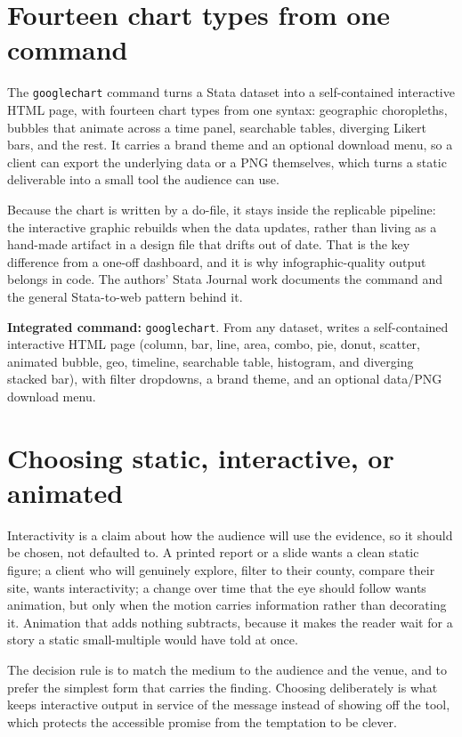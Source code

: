 \documentclass[
    a4paper,
    fontsize=10pt,
    twoside=true,
    numbers=noenddot,
]{kaobook}
\begin{document}
\section{Fourteen chart types from one command}
The \texttt{googlechart} command turns a Stata dataset into a self-contained interactive HTML page, with fourteen chart types from one syntax: geographic choropleths, bubbles that animate across a time panel, searchable tables, diverging Likert bars, and the rest. It carries a brand theme and an optional download menu, so a client can export the underlying data or a PNG themselves, which turns a static deliverable into a small tool the audience can use.

Because the chart is written by a do-file, it stays inside the replicable pipeline: the interactive graphic rebuilds when the data updates, rather than living as a hand-made artifact in a design file that drifts out of date. That is the key difference from a one-off dashboard, and it is why infographic-quality output belongs in code. The authors' Stata Journal work documents the command and the general Stata-to-web pattern behind it.

\begin{kaobox}[frametitle=Package Integration: \texttt{googlechart}]
\textbf{Integrated command:} \texttt{googlechart}. From any dataset, writes a self-contained interactive HTML page (column, bar, line, area, combo, pie, donut, scatter, animated bubble, geo, timeline, searchable table, histogram, and diverging stacked bar), with filter dropdowns, a brand theme, and an optional data/PNG download menu.
\end{kaobox}

\section{Choosing static, interactive, or animated}
Interactivity is a claim about how the audience will use the evidence, so it should be chosen, not defaulted to. A printed report or a slide wants a clean static figure; a client who will genuinely explore, filter to their county, compare their site, wants interactivity; a change over time that the eye should follow wants animation, but only when the motion carries information rather than decorating it. Animation that adds nothing subtracts, because it makes the reader wait for a story a static small-multiple would have told at once.

The decision rule is to match the medium to the audience and the venue, and to prefer the simplest form that carries the finding. Choosing deliberately is what keeps interactive output in service of the message instead of showing off the tool, which protects the accessible promise from the temptation to be clever.
\end{document}
